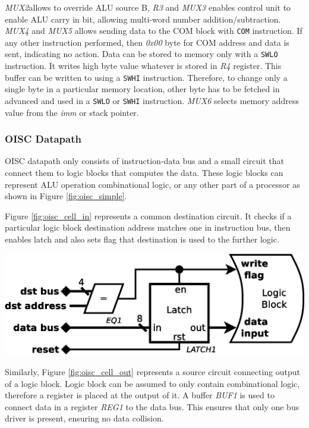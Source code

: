 \textit{MUX2}allows to override ALU source B, \textit{R3} and \textit{MUX3} enables control unit to enable ALU carry in bit, allowing multi-word number addition/subtraction. \textit{MUX4} and \textit{MUX5} allows sending data to the COM block with \texttt{COM} instruction. If any other instruction performed, then \textit{0x00} byte for COM address and data is sent, indicating no action. Data can be stored to memory only with a \texttt{SWLO} instruction. It writes high byte value whatever is stored in \textit{R4} register. This buffer can be written to using a \texttt{SWHI} instruction. Therefore, to change only a single byte in a particular memory location, other byte has to be fetched in advanced and used in a \texttt{SWLO} or \texttt{SWHI} instruction. \textit{MUX6} selects memory address value from the \textit{imm} or stack pointer.

\subsubsection{OISC Datapath} \label{subsec:oisc_cells}
OISC datapath only consists of instruction-data bus and a small circuit that connect them to logic blocks that computes the data. These logic blocks can represent ALU operation combinational logic, or any other part of a processor as shown in Figure \ref{fig:oisc_simple}.

Figure \ref{fig:oisc_cell_in} represents a common destination circuit. It checks if a particular logic block destination address matches one in instruction bus, then enables latch and also sets flag that destination is used to the further logic. 
\begin{colfigure}
	\centering
	\includegraphics[width=\linewidth]{../resources/oisc_cell_in.eps}
	\label{fig:oisc_cell_in}
\end{colfigure}

Similarly, Figure \ref{fig:oisc_cell_out} represents a source circuit connecting output of a logic block. Logic block can be assumed to only contain combinational logic, therefore a register is placed at the output of it. A buffer \textit{BUF1} is used to connect data in a register \textit{REG1} to the data bus. This ensures that only one bus driver is present, ensuring no data collision. 

